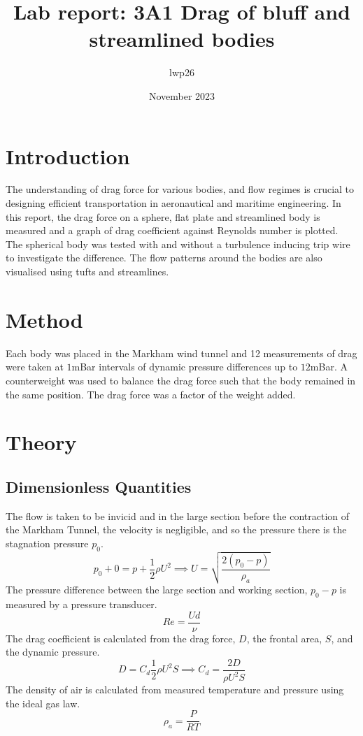 \documentclass[8pt]{article}
\begin{document}


\title{Lab report: 3A1 Drag of bluff and streamlined bodies}
\author{lwp26}
\date{November 2023}
\maketitle

\section{Introduction}

The understanding of drag force for various bodies, and flow regimes is crucial to designing efficient transportation in aeronautical and maritime engineering.
In this report, the drag force on a sphere, flat plate and streamlined body is measured and a graph of drag coefficient against Reynolds number is plotted.
The spherical body was tested with and without a turbulence inducing trip wire to investigate the difference.
The flow patterns around the bodies are also visualised using tufts and streamlines.

\section{Method}
Each body was placed in the Markham wind tunnel and 12 measurements of drag were taken at $1$mBar intervals of dynamic pressure differences up to $12$mBar.
A counterweight was used to balance the drag force such that the body remained in the same position. The drag force was a factor of the weight added.

\section{Theory}

\subsection{Dimensionless Quantities}

The flow is taken to be invicid and in the large section before the contraction of the Markham Tunnel, the velocity is negligible, and so the pressure there is the stagnation pressure $p_0$.
\begin{equation}
    p_0 + 0 = p + \frac{1}{2}\rho U^2 \implies U = \sqrt{\frac{2(p_0-p)}{\rho_a}}
    \label{eq1}
\end{equation}
The pressure difference between the large section and working section, $p_0 - p$ is measured by a pressure transducer.
\begin{equation}
    Re = \frac{Ud}{\nu}
    \label{re}
\end{equation}
The drag coefficient is calculated from the drag force, $D$, the frontal area, $S$, and the dynamic pressure.
\begin{equation}
    D = C_d \frac{1}{2} \rho U^2 S \implies C_d = \frac{2D}{ \rho U^2 S}
\end{equation}
The density of air is calculated from measured temperature and pressure using the ideal gas law.
\begin{equation}
    \rho_a = \frac{P}{RT}
\end{equation}
\end{document}
